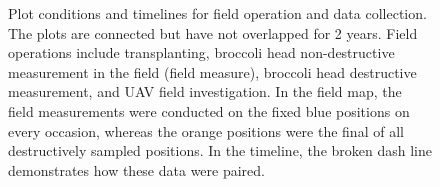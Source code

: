 \begin{figure}[htb]
  \begin{center}
  \end{center}
  \caption[Plot conditions and timelines for field operation and data collection]{
    Plot conditions and timelines for field operation and data collection. The plots are connected but have not overlapped for 2 years. Field operations include transplanting, broccoli head non-destructive measurement in the field (field measure), broccoli head destructive measurement, and UAV field investigation. In the field map, the field measurements were conducted on the fixed blue positions on every occasion, whereas the orange positions were the final of all destructively sampled positions. In the timeline, the broken dash line demonstrates how these data were paired.
  }
  \label{fig:bro5}
\end{figure}